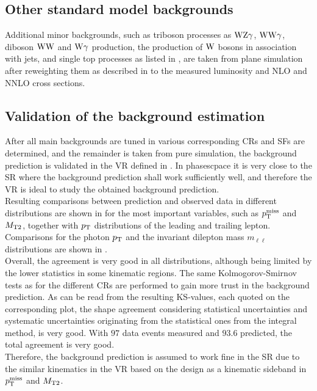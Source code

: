 \subsection{Other standard model backgrounds}
Additional minor backgrounds, such as triboson processes as $\mathrm{W}\mathrm{Z}\gamma$, $\mathrm{W}\mathrm{W}\gamma$, diboson $\mathrm{W}\mathrm{W}$ and $\mathrm{W}\gamma$ production, the production of $\mathrm{W}$ bosons in association with jets, and single top processes as listed in , are taken from plane simulation after reweighting them as described in  to the measured luminosity and NLO and NNLO cross sections.

\FloatBarrier
\subsection{Validation of the background estimation}\label{sec:Validation}
After all main backgrounds are tuned in various corresponding CRs and SFs are determined, and the remainder is taken from pure simulation, the background prediction is validated in the VR defined in . In phasescpace it is very close to the SR where the background prediction shall work sufficiently well, and therefore the VR is ideal to study the obtained background prediction.\\
Resulting comparisons between prediction and observed data in different distributions are shown in  for the most important variables, such as $p_{\mathrm{T}}^\text{miss}$ and $M_{\mathrm{T2}}$, together with $p_{\mathrm{T}}$ distributions of the leading and trailing lepton. Comparisons for the photon $p_{\mathrm{T}}$ and the invariant dilepton mass $m_{\ell\ell}$ distributions are shown in .\\
Overall, the agreement is very good in all distributions, although being limited by the lower statistics in some kinematic regions. The same Kolmogorov-Smirnov tests as for the different CRs are performed to gain more trust in the background prediction. As can be read from the resulting KS-values, each quoted on the corresponding plot, the shape agreement considering statistical uncertainties and systematic uncertainties originating from the statistical ones from the integral method, is very good. With $97$ data events measured and $93.6$ predicted, the total agreement is very good.\\
Therefore, the background prediction is assumed to work fine in the SR due to the similar kinematics in the VR based on the design as a kinematic sideband in $p_{\mathrm{T}}^\text{miss}$ and $M_{\mathrm{T2}}$.
